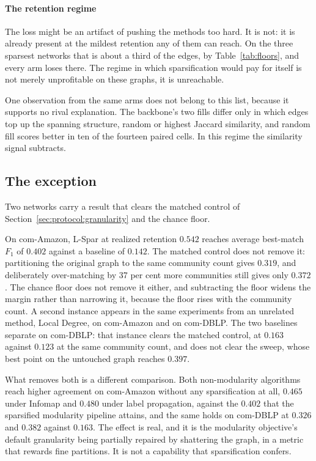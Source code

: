 \paragraph{The retention regime}
The loss might be an artifact of pushing the methods too hard. It is not: it is
already present at the mildest retention any of them can reach. On the three
sparsest networks that is about a third of the edges, by Table~\ref{tab:floors},
and every arm loses there. The regime in which sparsification would pay for itself
is not merely unprofitable on these graphs, it is unreachable.

One observation from the same arms does not belong to this list, because it
supports no rival explanation. The backbone's two fills differ only in which edges
top up the spanning structure, random or highest Jaccard similarity, and random
fill scores better in ten of the fourteen paired cells. In this regime the
similarity signal subtracts.

\subsection{The exception}\label{sec:experiments:exception}

Two networks carry a result that clears the matched control of
Section~\ref{sec:protocol:granularity} and the chance floor.

On com-Amazon, L-Spar at realized retention $0.542$
reaches average best-match $F_1$ of $0.402$ against a baseline of $0.142$. The
matched control does not remove it: partitioning the original graph to the
same community count gives $0.319$, and deliberately over-matching by 37 per cent
more communities still gives only $0.372$. The chance floor does not remove it
either, and subtracting the floor widens the margin rather than narrowing it,
because the floor rises with the community count. A second instance
appears in the same experiments from an unrelated method, Local Degree, on
com-Amazon and on com-DBLP. The two baselines separate on com-DBLP: that instance
clears the matched control, at $0.163$ against $0.123$ at the same community
count, and does not clear the sweep, whose best point on the untouched graph
reaches $0.397$.

What removes both is a different comparison. Both non-modularity algorithms reach
higher agreement on com-Amazon without any sparsification at all, $0.465$ under
Infomap and $0.480$ under label propagation, against the $0.402$ that the
sparsified modularity pipeline attains, and the same holds on com-DBLP at
$0.326$ and $0.382$ against $0.163$. The effect is real, and it is the
modularity objective's default granularity being partially repaired by shattering
the graph, in a metric that rewards fine partitions. It is not a capability that
sparsification confers.

